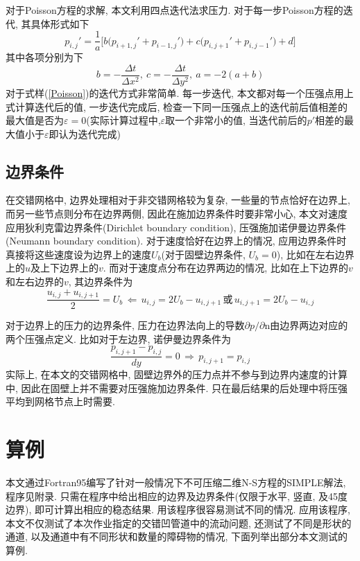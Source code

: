 \documentclass[a4paper,boxed,11pt]{caspset}
\begin{document}
对于Poisson方程的求解, 本文利用四点迭代法求压力. 对于每一步Poisson方程的迭代, 其具体形式如下
\begin{equation}\label{Poisson}
p_{i,j}' = \frac{1}{a}\bigg[b\big(p_{i+1,j}'+p_{i-1,j}'\big)
+
c\big(p_{i,j+1}'+p_{i,j-1}'\big)+d\bigg]
\end{equation}
其中各项分别为下
\[
b= -\frac{\Delta t}{\Delta x^2},\: c = -\frac{\Delta t}{\Delta y^2},\: a = -2(a+b)
\]
对于式样(\ref{Poisson})的迭代方式非常简单. 每一步迭代, 本文都对每一个压强点用上式计算迭代后的值, 一步迭代完成后, 检查一下同一压强点上的迭代前后值相差的最大值是否为$\varepsilon=0$(实际计算过程中,$\varepsilon$取一个非常小的值, 当迭代前后的$p'$相差的最大值小于$\varepsilon$即认为迭代完成)
\subsection{边界条件}
在交错网格中, 边界处理相对于非交错网格较为复杂, 一些量的节点恰好在边界上, 而另一些节点则分布在边界两侧, 因此在施加边界条件时要非常小心, 本文对速度应用狄利克雷边界条件(Dirichlet boundary condition), 压强施加诺伊曼边界条件(Neumann boundary condition). 对于速度恰好在边界上的情况, 应用边界条件时真接将这些速度设为边界上的速度$U_b$(对于固壁边界条件, $U_b=0$), 比如在左右边界上的$u$及上下边界上的$v$. 而对于速度点分布在边界两边的情况, 比如在上下边界的$v$和左右边界的$v$, 其边界条件为
\[
\frac{u_{i,j}+u_{i,j+1}}{2} = U_b\, \Longleftarrow\, u_{i,j} = 2U_b - u_{i,j+1}\,\text{或}\, u_{i,j+1} = 2U_b - u_{i,j}
\]

对于边界上的压力的边界条件, 压力在边界法向上的导数$\partial p/\partial \mathrm{n}$由边界两边对应的两个压强点定义. 比如对于左边界, 诺伊曼边界条件为
\[
\frac{p_{i,j+1}-p_{i,j}}{dy} = 0 \, \Longrightarrow\, p_{i,j+1} = p_{i,j}
\]
实际上, 在本文的交错网格中, 固壁边界外的压力点并不参与到边界内速度的计算中, 因此在固壁上并不需要对压强施加边界条件. 只在最后结果的后处理中将压强平均到网格节点上时需要.



\section{算例}
本文通过Fortran95编写了针对一般情况下不可压缩二维N-S方程的SIMPLE解法, 程序见附录. 只需在程序中给出相应的边界及边界条件(仅限于水平, 竖直, 及45度边界), 即可计算出相应的稳态结果. 用该程序很容易测试不同的情况. 应用该程序, 本文不仅测试了本次作业指定的交错凹管道中的流动问题, 还测试了不同是形状的通道, 以及通道中有不同形状和数量的障碍物的情况, 下面列举出部分本文测试的算例.
\end{document}
